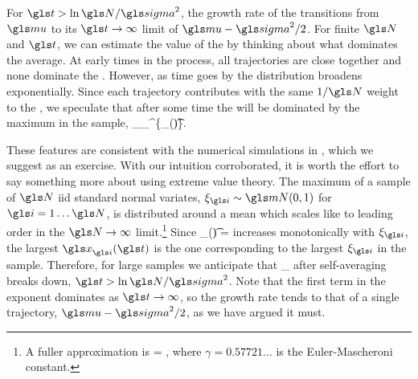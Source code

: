 For $\t>\ln \N/\gsigma^2$, the growth rate of the \FEA transitions from $\gmu$ to its $\t\to\infty$ limit of $\gmu-\gsigma^2/2$. For finite $\N$ and $\t$, we can estimate the value of the \FEA by thinking about what dominates the average. At early times in the process, all trajectories are close together and none dominate the \FEA. However, as time goes by the distribution broadens exponentially. Since each trajectory contributes with the same $1/\N$ weight to the \FEA, we speculate that after some time the \FEA will be dominated by the maximum in the sample, \ie
\be
\ave{\x(\t)}_\N \approx {}\max_{}^\N \{\x_\gi(\t)\}.
\ee

These features are consistent with the numerical simulations in , which we suggest as an exercise. With our intuition corroborated, it is worth the effort to say something more about  using extreme value theory. The maximum of a sample of $\N$ iid standard normal variates, $\xi_\gi\sim\mN(0,1)$ for $\gi=1\dots\N$, is distributed around a mean which scales like
\be
{} \approx \sqrt{2\ln\N}
\ee
to leading order in the $\N\to\infty$ limit.\footnote{A fuller approximation is
\be
{} = ,
\ee
where $\gamma=0.57721\dots$ is the Euler-Mascheroni constant.} Since
\be
\x_\gi(\t) = \exp{}
\ee
increases monotonically with $\xi_\gi$, the largest $\x_\gi(\t)$ is the one corresponding to the largest $\xi_\gi$ in the sample. Therefore, for large samples we anticipate that
\be
\ave{\x(\t)}_\N \approx {} \exp{}
\ee
after self-averaging breaks down, $\t>\ln\N/\gsigma^2$. Note that the first term in the exponent dominates as $\t\to\infty$, so the growth rate tends to that of a single trajectory, $\gmu-\gsigma^2/2$, as we have argued it must.

